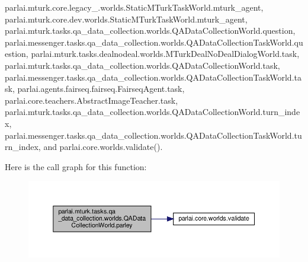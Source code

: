 parlai.\+mturk.\+core.\+legacy\+\_.\+worlds.\+Static\+M\+Turk\+Task\+World.\+mturk\+\_\+agent, parlai.\+mturk.\+core.\+dev.\+worlds.\+Static\+M\+Turk\+Task\+World.\+mturk\+\_\+agent, parlai.\+mturk.\+tasks.\+qa\+\_\+data\+\_\+collection.\+worlds.\+Q\+A\+Data\+Collection\+World.\+question, parlai.\+messenger.\+tasks.\+qa\+\_\+data\+\_\+collection.\+worlds.\+Q\+A\+Data\+Collection\+Task\+World.\+question, parlai.\+mturk.\+tasks.\+dealnodeal.\+worlds.\+M\+Turk\+Deal\+No\+Deal\+Dialog\+World.\+task, parlai.\+mturk.\+tasks.\+qa\+\_\+data\+\_\+collection.\+worlds.\+Q\+A\+Data\+Collection\+World.\+task, parlai.\+messenger.\+tasks.\+qa\+\_\+data\+\_\+collection.\+worlds.\+Q\+A\+Data\+Collection\+Task\+World.\+task, parlai.\+agents.\+fairseq.\+fairseq.\+Fairseq\+Agent.\+task, parlai.\+core.\+teachers.\+Abstract\+Image\+Teacher.\+task, parlai.\+mturk.\+tasks.\+qa\+\_\+data\+\_\+collection.\+worlds.\+Q\+A\+Data\+Collection\+World.\+turn\+\_\+index, parlai.\+messenger.\+tasks.\+qa\+\_\+data\+\_\+collection.\+worlds.\+Q\+A\+Data\+Collection\+Task\+World.\+turn\+\_\+index, and parlai.\+core.\+worlds.\+validate().

Here is the call graph for this function\+:
\nopagebreak
\begin{figure}[H]
\begin{center}
\leavevmode
\includegraphics[width=350pt]{classparlai_1_1mturk_1_1tasks_1_1qa__data__collection_1_1worlds_1_1QADataCollectionWorld_a50f26229a3c460bded227df6321d7d8e_cgraph}
\end{center}
\end{figure}
\mbox{\label{classparlai_1_1mturk_1_1tasks_1_1qa__data__collection_1_1worlds_1_1QADataCollectionWorld_ae139d050cb006e092cbba6de81cd5ba9}} 
